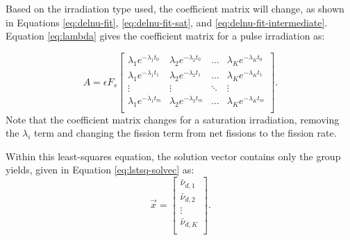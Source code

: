 Based on the irradiation type used, the coefficient matrix will change, as shown in Equations \eqref{eq:delnu-fit}, \eqref{eq:delnu-fit-sat}, and \eqref{eq:delnu-fit-intermediate}. 
Equation \eqref{eq:lambda} gives the coefficient matrix for a pulse irradiation as:

\begin{equation}
A = \epsilon F_s
\begin{bmatrix}
\lambda_1 e^{-\lambda_1 t_0} & \lambda_2 e^{-\lambda_2 t_0} & \hdots &  \lambda_K e^{-\lambda_K t_0}\\
\lambda_1 e^{-\lambda_1 t_1} & \lambda_2 e^{-\lambda_2 t_1} & \hdots &  \lambda_K e^{-\lambda_K t_1}\\
\vdots                       & \vdots                       & \ddots &  \vdots                      \\
\lambda_1 e^{-\lambda_1 t_m} & \lambda_2 e^{-\lambda_2 t_m} &  \hdots  & \lambda_K e^{-\lambda_K t_m}\\
\end{bmatrix}.
\label{eq:lambda}
\end{equation}
Note that the coefficient matrix changes for a saturation irradiation, removing the $\lambda_i$ term and changing the fission term from net fissions to the fission rate.

Within this least-squares equation, the solution vector contains only the group yields, given in Equation \eqref{eq:lstsq-solvec} as:
\begin{equation}
\vec{x} = 
\begin{bmatrix}
\bar{\nu}_{d, 1}\\
\bar{\nu}_{d, 2}\\
\vdots\\
\bar{\nu}_{d, K}\\
\end{bmatrix}.
\label{eq:lstsq-solvec}
\end{equation}

